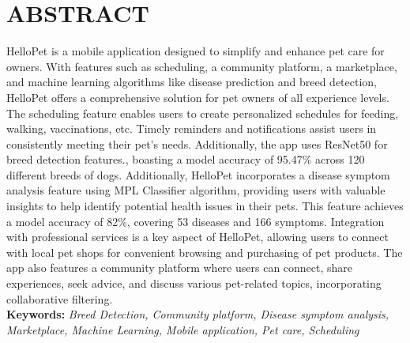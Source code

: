 


\section*{ABSTRACT}
\justify

HelloPet is a mobile application designed to simplify and enhance pet care for owners. With features such as scheduling, a community platform, a marketplace, and machine learning algorithms like disease prediction and breed detection, HelloPet offers a comprehensive solution for pet owners of all experience levels. The scheduling feature enables users to create personalized schedules for feeding, walking, vaccinations, etc. Timely reminders and notifications assist users in consistently meeting their pet’s needs. Additionally, the app uses ResNet50 for breed detection features., boasting a model accuracy of 95.47\% across 120 different breeds of dogs. Additionally, HelloPet incorporates a disease symptom analysis feature using MPL Classifier algorithm, providing users with valuable insights to help identify potential health issues in their pets. This feature achieves a model accuracy of 82\%, covering 53 diseases and 166 symptoms. Integration with professional services is a key aspect of HelloPet, allowing users to connect with local pet shops for convenient browsing and purchasing of pet products. The app also features a community platform where users can connect, share experiences, seek advice, and discuss various pet-related topics, incorporating collaborative filtering.
\\
\textbf{Keywords:} \textit{Breed Detection, Community platform, Disease symptom analysis, Marketplace, Machine Learning, Mobile application, Pet care, Scheduling}



